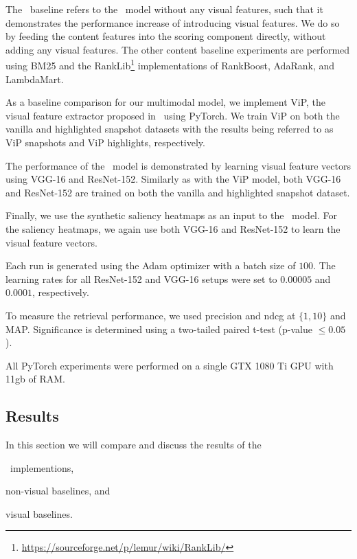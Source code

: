 The \modelname~baseline refers to the \modelname~model without any visual features, such that it demonstrates the performance increase of introducing visual features. We do so by feeding the content features into the scoring component directly, without adding any visual features. 
The other content baseline experiments are performed using BM25 and the RankLib\footnote{\url{https://sourceforge.net/p/lemur/wiki/RankLib/}} implementations of RankBoost, AdaRank, and LambdaMart.

As a baseline comparison for our multimodal model, we implement ViP, the visual feature extractor proposed in~\citet{fan2017learning} using PyTorch. We train ViP on both the vanilla and highlighted snapshot datasets with the results being referred to as ViP snapshots and ViP highlights, respectively.

The performance of the \modelname~model is demonstrated by learning visual feature vectors using VGG-16 and ResNet-152. Similarly as with the ViP model, both VGG-16 and ResNet-152 are trained on both the vanilla and highlighted snapshot dataset. 

Finally, we use the synthetic saliency heatmaps as an input to the \modelname~model. For the saliency heatmaps, we again use both VGG-16 and ResNet-152 to learn the visual feature vectors.

Each run is generated using the Adam optimizer with a batch size of $100$. The learning rates for all ResNet-152 and VGG-16 setups were set to $0.00005$ and $0.0001$, respectively. 

To measure the retrieval performance, we used precision and ndcg at $\{1,10\}$ and MAP.
Significance is determined using a two-tailed paired t-test (p-value $\leq 0.05$). 

All PyTorch experiments were performed on a single GTX 1080 Ti GPU with 11gb of RAM. 


\subsection{Results}
In this section we will compare and discuss the results of the 
\begin{inparaenum}[(i)]
\item \modelname~implementions, 
\item non-visual baselines, and 
\item visual baselines.
\end{inparaenum}  

